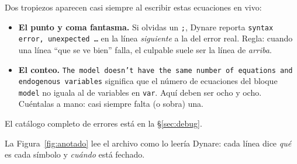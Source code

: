 \documentclass[11pt,a4paper]{report}
\newenvironment{errorbox}[1][]{%
  \begin{tcolorbox}[errorstyle, title={\erroricon~~Error común%
    \ifx\relax#1\relax\else: #1\fi}]}%
{\end{tcolorbox}}
\newcommand{\code}[1]{\texttt{#1}}
\newcommand{\erroricon}{\raisebox{-0.5pt}{\begin{tikzpicture}[scale=0.11,baseline=-0.5ex]
  \draw[line width=2.4pt, line join=round] (0,1.9) -- (-1.1,-0.05) -- (1.1,-0.05) -- cycle;
  \draw[line width=2.2pt, line cap=round] (0,1.28) -- (0,0.58);
  \fill (0,0.28) circle (1.7pt);
\end{tikzpicture}}}
\begin{document}
\begin{errorbox}[al teclear el bloque \code{model}]
Dos tropiezos aparecen casi siempre al escribir estas ecuaciones en vivo:
\begin{itemize}[leftmargin=1.2em, topsep=2pt, itemsep=2pt]
\item \textbf{El punto y coma fantasma.} Si olvidas un \code{;}, Dynare reporta
  \texttt{syntax error, unexpected \ldots} en la línea \emph{siguiente} a la del
  error real. Regla: cuando una línea ``que se ve bien'' falla, el culpable suele
  ser la línea de \emph{arriba}.
\item \textbf{El conteo.} \texttt{The model doesn't have the same number of
  equations and endogenous variables} significa que el número de ecuaciones del
  bloque \code{model} no iguala al de variables en \code{var}. Aquí deben ser
  ocho y ocho. Cuéntalas a mano: casi siempre falta (o sobra) una.
\end{itemize}
El catálogo completo de errores está en la \S\ref{sec:debug}.
\end{errorbox}

La Figura~\ref{fig:anotado} lee el archivo como lo leería Dynare: cada línea dice
\emph{qué} es cada símbolo y \emph{cuándo} está fechado.
\end{document}
